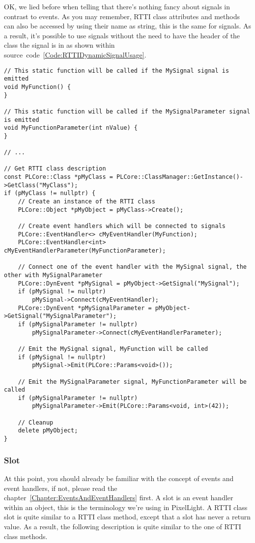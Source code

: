 OK, we lied before when telling that there's nothing fancy about signals in contrast to events. As you may remember, \ac{RTTI} class attributes and methods can also be accessed by using their name as string, this is the same for signals. As a result, it's possible to use signals without the need to have the header of the class the signal is in as shown within source~code~\ref{Code:RTTIDynamicSignalUsage}.
\begin{lstlisting}[label=Code:RTTIDynamicSignalUsage,caption={Using signals of a \ac{RTTI} class dynamically}]
// This static function will be called if the MySignal signal is emitted
void MyFunction() {
}

// This static function will be called if the MySignalParameter signal is emitted
void MyFunctionParameter(int nValue) {
}

// ...

// Get RTTI class description
const PLCore::Class *pMyClass = PLCore::ClassManager::GetInstance()->GetClass("MyClass");
if (pMyClass != nullptr) {
	// Create an instance of the RTTI class
	PLCore::Object *pMyObject = pMyClass->Create();

	// Create event handlers which will be connected to signals
	PLCore::EventHandler<> cMyEventHandler(MyFunction);
	PLCore::EventHandler<int> cMyEventHandlerParameter(MyFunctionParameter);

	// Connect one of the event handler with the MySignal signal, the other with MySignalParameter
	PLCore::DynEvent *pMySignal = pMyObject->GetSignal("MySignal");
	if (pMySignal != nullptr)
		pMySignal->Connect(cMyEventHandler);
	PLCore::DynEvent *pMySignalParameter = pMyObject->GetSignal("MySignalParameter");
	if (pMySignalParameter != nullptr)
		pMySignalParameter->Connect(cMyEventHandlerParameter);

	// Emit the MySignal signal, MyFunction will be called
	if (pMySignal != nullptr)
		pMySignal->Emit(PLCore::Params<void>());

	// Emit the MySignalParameter signal, MyFunctionParameter will be called
	if (pMySignalParameter != nullptr)
		pMySignalParameter->Emit(PLCore::Params<void, int>(42));

	// Cleanup
	delete pMyObject;
}
\end{lstlisting}



\subsubsection{Slot}
At this point, you should already be familiar with the concept of events and event handlers, if not, please read the chapter~\ref{Chapter:EventsAndEventHandlers} first. A slot is an event handler within an object, this is the terminology we're using in PixelLight. A \ac{RTTI} class slot is quite similar to a \ac{RTTI} class method, except that a slot has never a return value. As a result, the following description is quite similar to the one of \ac{RTTI} class methods.


